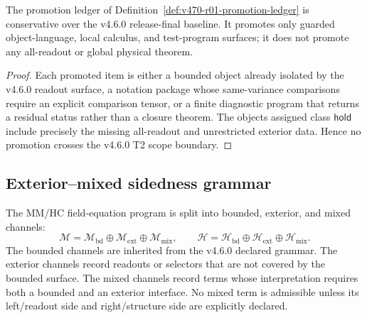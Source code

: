 \begin{proposition}
\label{prop:v470-r01-promotion-conservativity}
The promotion ledger of Definition~\ref{def:v470-r01-promotion-ledger} is
conservative over the v4.6.0 release-final baseline.  It promotes only guarded
object-language, local calculus, and test-program surfaces; it does not promote
any all-readout or global physical theorem.
\end{proposition}

\begin{proof}
Each promoted item is either a bounded object already isolated by the v4.6.0
readout surface, a notation package whose same-variance comparisons require an
explicit comparison tensor, or a finite diagnostic program that returns a
residual status rather than a closure theorem.  The objects assigned class
\(\mathsf{hold}\) include precisely the missing all-readout and unrestricted
exterior data.  Hence no promotion crosses the v4.6.0 T2 scope boundary.
\end{proof}

\subsection{Exterior--mixed sidedness grammar}
\label{subsec:v470-r01-extmix-sidedness-grammar}

\begin{definition}
\label{def:v470-r01-sided-mm-hc-channel-split}
The MM/HC field-equation program is split into bounded, exterior, and mixed
channels:
\[
\mathcal M=\mathcal M_{\mathrm{bd}}\oplus\mathcal M_{\mathrm{ext}}
\oplus\mathcal M_{\mathrm{mix}},
\qquad
\mathcal H=\mathcal H_{\mathrm{bd}}\oplus\mathcal H_{\mathrm{ext}}
\oplus\mathcal H_{\mathrm{mix}}.
\]
The bounded channels are inherited from the v4.6.0 declared grammar.  The
exterior channels record readouts or selectors that are not covered by the
bounded surface.  The mixed channels record terms whose interpretation requires
both a bounded and an exterior interface.  No mixed term is admissible unless its
left/readout side and right/structure side are explicitly declared.
\end{definition}

